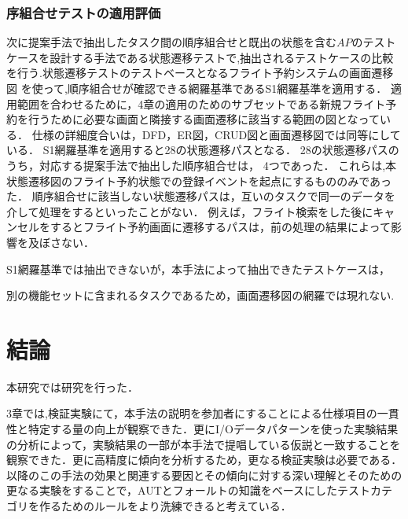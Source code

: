 \documentclass[10pt,a4j]{jarticle}
\begin{document}
\subsubsection{序組合せテストの適用評価} \label{sec:5-2-2}
次に提案手法で抽出したタスク間の順序組合せと既出の状態を含む$AP$のテストケースを設計する手法である状態遷移テストで,抽出されるテストケースの比較を行う.状態遷移テストのテストベースとなるフライト予約システムの画面遷移図
を使って,順序組合せが確認できる網羅基準であるS1網羅基準を適用する．
適用範囲を合わせるために，4章の適用のためのサブセットである新規フライト予約を行うために必要な画面と隣接する画面遷移に該当する範囲の図となっている．
仕様の詳細度合いは，DFD，ER図，CRUD図と画面遷移図では同等にしている．
S1網羅基準を適用すると28の状態遷移パスとなる．
28の状態遷移パスのうち，対応する提案手法で抽出した順序組合せは，
4つであった．
これらは,本状態遷移図のフライト予約状態での登録イベントを起点にするもののみであった．
順序組合せに該当しない状態遷移パスは，互いのタスクで同一のデータを介して処理をするといったことがない．
例えば，フライト検索をした後にキャンセルをするとフライト予約画面に遷移するパスは，前の処理の結果によって影響を及ぼさない．

S1網羅基準では抽出できないが，本手法によって抽出できたテストケースは，

別の機能セットに含まれるタスクであるため，画面遷移図の網羅では現れない.


\section{結論} \label{chap:6}

本研究では研究を行った．

3章では,検証実験にて，本手法の説明を参加者にすることによる仕様項目の一貫性と特定する量の向上が観察できた．更にI/Oデータパターンを使った実験結果の分析によって，実験結果の一部が本手法で提唱している仮説と一致することを観察できた．更に高精度に傾向を分析するため，更なる検証実験は必要である．以降のこの手法の効果と関連する要因とその傾向に対する深い理解とそのための更なる実験をすることで，AUTとフォールトの知識をベースにしたテストカテゴリを作るためのルールをより洗練できると考えている．
\end{document}
